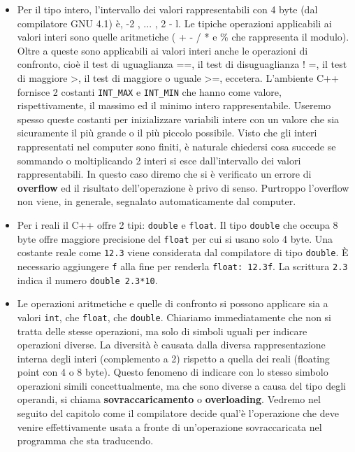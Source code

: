 \documentclass[a4paper,12pt]{book}
\begin{document}
\begin{itemize}
\item 
Per il tipo intero, l'intervallo dei valori rappresentabili con 4 byte (dal compilatore GNU 4.1) è, -2 , ... , 2 - l.
Le tipiche operazioni applicabili ai valori interi sono quelle aritmetiche ( + - / * e \% che rappresenta il modulo).
Oltre a queste sono applicabili ai valori interi anche le operazioni di confronto, cioè il test di uguaglianza ==, il test di disuguaglianza ! =, il test di maggiore >, il test di maggiore o uguale >=, eccetera.
L'ambiente C++ fornisce 2 costanti \texttt{INT\_MAX} e \texttt{INT\_MIN} che hanno come valore, rispettivamente, il massimo ed il minimo intero rappresentabile.
Useremo spesso queste costanti per inizializzare variabili intere con un valore che sia sicuramente il più grande o il più piccolo possibile.
Visto che gli interi rappresentati nel computer sono finiti, è naturale chiedersi cosa succede se sommando o moltiplicando 2 interi si esce dall'intervallo dei valori rappresentabili.
In questo caso diremo che si è verificato un errore di \textbf{overflow} ed il risultato dell'operazione è privo di senso.
Purtroppo l'overflow non viene, in generale, segnalato automaticamente dal computer.

\item
Per i reali il C++ offre 2 tipi: \texttt{double} e \texttt{float}.
Il tipo \texttt{double} che occupa 8 byte offre maggiore precisione del \texttt{float} per cui si usano solo 4 byte.
Una costante reale come \texttt{12.3} viene considerata dal compilatore di tipo \texttt{double}.
È necessario aggiungere \texttt{f} alla fine per renderla \texttt{float: 12.3f}.
La scrittura \texttt{2.3} indica il numero \texttt{double 2.3*10}.

\item
Le operazioni aritmetiche e quelle di confronto si possono applicare sia a valori \texttt{int}, che \texttt{float}, che \texttt{double}.
Chiariamo immediatamente che non si tratta delle stesse operazioni, ma solo di simboli uguali per indicare operazioni diverse.
La diversità è causata dalla diversa rappresentazione interna degli interi (complemento a 2) rispetto a quella dei reali (floating point con 4 o 8 byte).
Questo fenomeno di indicare con lo stesso simbolo operazioni simili concettualmente, ma che sono diverse a causa del tipo degli operandi, si chiama \textbf{sovraccaricamento} o \textbf{overloading}.
Vedremo nel seguito del capitolo come il compilatore decide qual'è l'operazione che deve venire effettivamente usata a fronte di un'operazione sovraccaricata nel programma che sta traducendo.


\end{itemize}
\end{document}
